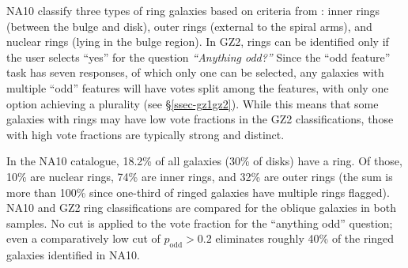 \documentclass[useAMS,usenatbib]{mn2e}
\begin{document}
NA10 classify three types of ring galaxies based on criteria from \citet{but96}: inner rings (between the bulge and disk), outer rings (external to the spiral arms), and nuclear rings (lying in the bulge region). In GZ2, rings can be identified only if the user selects ``yes'' for the question {\it ``Anything odd?''} Since the ``odd feature'' task has seven responses, of which only one can be selected, any galaxies with multiple ``odd'' features will have votes split among the features, with only one option achieving a plurality (see \S\ref{ssec-gz1gz2}). While this means that some galaxies with rings may have low vote fractions in the GZ2 classifications, those with high vote fractions are typically strong and distinct.

In the NA10 catalogue, 18.2\% of all galaxies (30\% of disks) have a ring. Of those, 10\% are nuclear rings, 74\% are inner rings, and 32\% are outer rings (the sum is more than 100\% since one-third of ringed galaxies have multiple rings flagged). NA10 and GZ2 ring classifications are compared for the oblique galaxies in both samples. No cut is applied to the vote fraction for the ``anything odd'' question; even a comparatively low cut of $p_\mathrm{odd}>0.2$ eliminates roughly 40\% of the ringed galaxies identified in NA10. %
\end{document}
